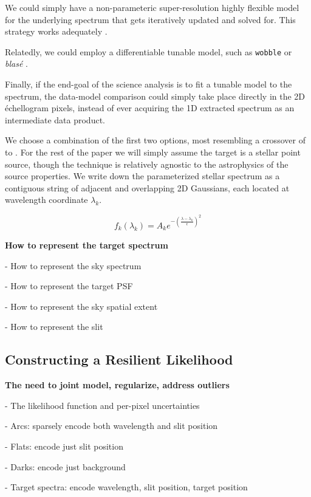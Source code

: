 \documentclass[twocolumn]{aastex631}
\begin{document}
We could simply have a non-parameteric super-resolution highly flexible model for the underlying spectrum that gets iteratively updated and solved for.  This strategy works adequately \citep{2010PASP..122..248B}.

Relatedly, we could employ a differentiable tunable model, such as \texttt{wobble} \citep{2019AJ....158..164B} or \emph{blas\'e} \citep{2022ApJ...941..200G}.

Finally, if the end-goal of the science analysis is to fit a tunable model to the spectrum, the data-model comparison could simply take place directly in the 2D \'echellogram pixels, instead of ever acquiring the 1D extracted spectrum as an intermediate data product.

We choose a combination of the first two options, most resembling a crossover of  \citet{2010PASP..122..248B} to \citet{2019AJ....158..164B}.  For the rest of the paper we will simply assume the target is a stellar point source, though the technique is relatively agnostic to the astrophysics of the source properties.  We write down the parameterized stellar spectrum as a contiguous string of adjacent and overlapping 2D Gaussians, each located at wavelength coordinate $\lambda_k$.

\begin{equation}
  f_k(\lambda_k) = A_k e^{-\left (\frac{\lambda - \lambda_k}{\epsilon} \right )^2}
\end{equation}


\begin{mdframed}
  \textbf{How to represent the target spectrum} \par
  - How to represent the sky spectrum\par
  - How to represent the target PSF\par
  - How to represent the sky spatial extent\par
  - How to represent the slit\par
\end{mdframed}


\subsection{Constructing a Resilient Likelihood}
\begin{mdframed}
  \textbf{The need to joint model, regularize, address outliers} \par
  - The likelihood function and per-pixel uncertainties\par
  - Arcs: sparsely encode both wavelength and slit position\par
  - Flats: encode just slit position\par
  - Darks: encode just background\par
  - Target spectra: encode wavelength, slit position, target position\par
  \textcolor{lightgray}{\lipsum[7]}
\end{mdframed}
\end{document}
